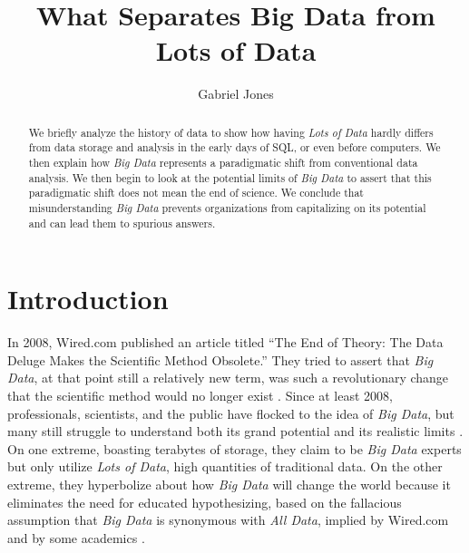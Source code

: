 \documentclass[sigconf]{acmart}
\begin{document}
\title{What Separates Big Data from Lots of Data }


\author{Gabriel Jones}

\renewcommand{\shortauthors}{G. Jones}


\begin{abstract}
We briefly analyze the history of data to show how having {\em Lots of Data} hardly differs from data storage and analysis in the early days of SQL, or even before computers. We then explain how {\em Big Data} represents a paradigmatic shift from conventional data analysis. We then begin to look at the potential limits of {\em Big Data} to assert that this paradigmatic shift does not mean the end of science. We conclude that misunderstanding {\em Big Data} prevents organizations from capitalizing on its potential and can lead them to spurious answers.
\end{abstract}


\maketitle

\section{Introduction}
In 2008, Wired.com published an article titled ``The End of Theory: The Data Deluge Makes the Scientific Method Obsolete.'' They tried to assert that {\em Big Data}, at that point still a relatively new term, was such a revolutionary change that the scientific method would no longer exist \cite{Wired}. Since at least 2008, professionals, scientists, and the public have flocked to the idea of {\em Big Data}, but many still struggle to understand both its grand potential and its realistic limits \cite{Marr2}. On one extreme, boasting terabytes of storage, they claim to be {\em Big Data} experts but only utilize {\em Lots of Data}, high quantities of traditional data. On the other extreme, they hyperbolize about how {\em Big Data} will change the world because it eliminates the need for educated hypothesizing, based on the fallacious assumption that {\em Big Data} is synonymous with {\em All Data}, implied by Wired.com and by some academics \cite{Keystone}.
\end{document}
